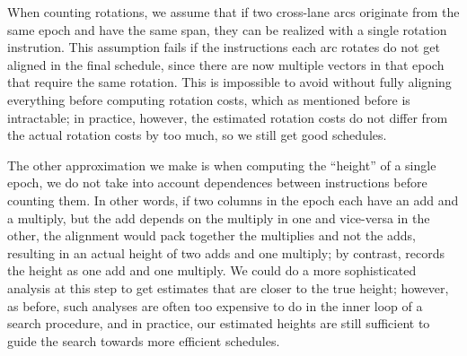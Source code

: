 When counting rotations, we assume that if two cross-lane arcs originate from the same epoch and have the same span, they can be realized with a single rotation instrution.
This assumption fails if the instructions each arc rotates  do not get aligned in the final schedule, since there are now multiple vectors in that epoch that require the same rotation.
This is impossible to avoid without fully aligning everything before computing rotation costs, which as mentioned before is intractable; in practice, however, the estimated rotation costs do not differ from the actual rotation costs by too much, so we still get good schedules. 

The other approximation we make is when computing the ``height'' of a single epoch, we do not take into account dependences between instructions before counting them. 
In other words, if two columns in the epoch each have an add and a multiply, but the add depends on the multiply in one and vice-versa in the other, the alignment would pack together the multiplies and not the adds, resulting in an actual height of two adds and one multiply; by contrast, \system records the height as one add and one multiply.
We could do a more sophisticated analysis at this step to get estimates that are closer to the true height; however, as before, such analyses are often too expensive to do in the inner loop of a search procedure, and in practice, our estimated heights are still sufficient to guide the search towards more efficient schedules. 



